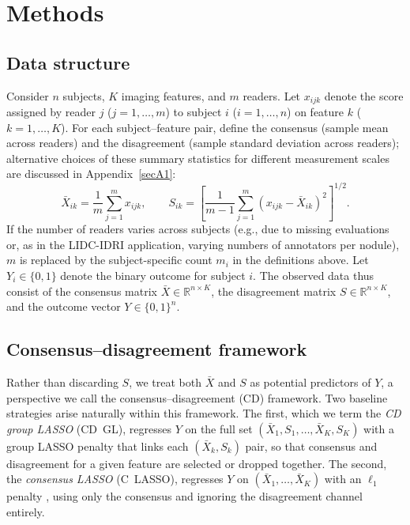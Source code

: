 \documentclass[referee,lineno,pdflatex,sn-vancouver-num]{sn-jnl}
\begin{document}
\section{Methods}\label{sec:methods}

\subsection{Data structure}\label{sec:data}

Consider $n$ subjects, $K$ imaging features, and $m$ readers.
Let $x_{ijk}$ denote the score assigned by reader $j$ ($j = 1,\dots,m$) to subject $i$ ($i = 1,\dots,n$) on feature $k$ ($k = 1,\dots,K$).
For each subject--feature pair, define the consensus (sample mean across readers) and the disagreement (sample standard deviation across readers); alternative choices of these summary statistics for different measurement scales are discussed in Appendix~\ref{secA1}:
\[
  \bar X_{ik} = \frac{1}{m}\sum_{j=1}^m x_{ijk}, \qquad
  S_{ik} = \left[\frac{1}{m-1}\sum_{j=1}^m (x_{ijk} - \bar X_{ik})^2\right]^{1/2}.
\]
If the number of readers varies across subjects (e.g., due to missing evaluations or, as in the LIDC-IDRI application, varying numbers of annotators per nodule), $m$ is replaced by the subject-specific count $m_i$ in the definitions above.
Let $Y_i \in \{0,1\}$ denote the binary outcome for subject $i$.
The observed data thus consist of the consensus matrix $\bar X \in \mathbb{R}^{n \times K}$, the disagreement matrix $S \in \mathbb{R}^{n \times K}$, and the outcome vector $Y \in \{0,1\}^n$.

\subsection{Consensus--disagreement framework}\label{sec:cd_framework}

Rather than discarding $S$, we treat both $\bar X$ and $S$ as potential predictors of $Y$, a perspective we call the consensus--disagreement (CD) framework.
Two baseline strategies arise naturally within this framework.
The first, which we term the \emph{CD group LASSO} (CD~GL), regresses $Y$ on the full set $(\bar X_1, S_1, \dots, \bar X_K, S_K)$ with a group LASSO penalty \cite{Yuan2006} that links each $(\bar X_k, S_k)$ pair, so that consensus and disagreement for a given feature are selected or dropped together.
The second, the \emph{consensus LASSO} (C~LASSO), regresses $Y$ on $(\bar X_1, \dots, \bar X_K)$ with an $\ell_1$ penalty \cite{Tibshirani1996}, using only the consensus and ignoring the disagreement channel entirely.
\end{document}
